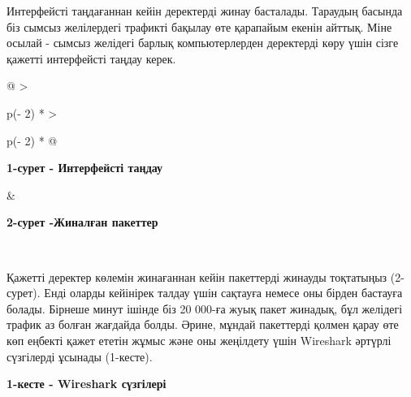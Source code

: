 Интерфейсті таңдағаннан кейін деректерді жинау басталады. Тараудың
басында біз сымсыз желілердегі трафикті бақылау өте қарапайым екенін
айттық. Міне осылай - сымсыз желідегі барлық компьютерлерден деректерді
көру үшін сізге қажетті интерфейсті таңдау керек.

\begin{longtable}[]{@{}
  >{\raggedright\arraybackslash}p{(\columnwidth - 2\tabcolsep) * }
  >{\raggedright\arraybackslash}p{(\columnwidth - 2\tabcolsep) * }@{}}
\toprule\noalign{}
\begin{minipage}[b]{\linewidth}\raggedright

\textbf{1-сурет - Интерфейсті таңдау}
\end{minipage} & \begin{minipage}[b]{\linewidth}\raggedright

\textbf{2-сурет -Жиналған пакеттер}
\end{minipage} \\
\midrule\noalign{}
\endhead
\bottomrule\noalign{}
\endlastfoot
\end{longtable}

Қажетті деректер көлемін жинағаннан кейін пакеттерді жинауды тоқтатыңыз
(2-сурет). Енді оларды кейінірек талдау үшін сақтауға немесе оны бірден
бастауға болады. Бірнеше минут ішінде біз 20 000-ға жуық пакет жинадық,
бұл желідегі трафик аз болған жағдайда болды. Әрине, мұндай пакеттерді
қолмен қарау өте көп еңбекті қажет ететін жұмыс және оны жеңілдету үшін
Wireshark әртүрлі сүзгілерді ұсынады (1-кесте).

\textbf{1-кесте - Wireshark сүзгілері}

